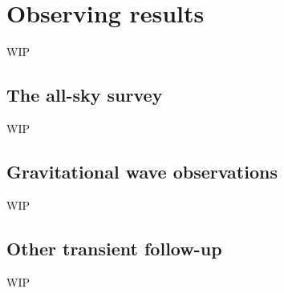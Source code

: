 \section{Observing results}
\label{sec:observing}
\begin{colsection}


\begin{colsection}

WIP

\end{colsection}


\subsection{The all-sky survey}
\label{sec:survey_results}
\begin{colsection}

WIP

\end{colsection}


\subsection{Gravitational wave observations}
\label{sec:gw_results}
\begin{colsection}

WIP

\end{colsection}


\subsection{Other transient follow-up}
\label{sec:other_results}
\begin{colsection}

WIP

\end{colsection}


\end{colsection}


\newpage
